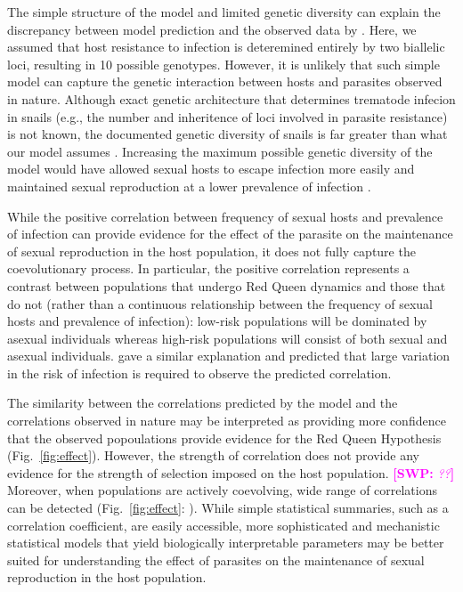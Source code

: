 \documentclass{article}\usepackage[]{graphicx}\usepackage[]{color}
\newcommand{\comment}[3]{\textcolor{#1}{\textbf{[#2: }\textit{#3}\textbf{]}}}
\newcommand{\swp}[1]{\comment{magenta}{SWP}{#1}}
\newcommand{\fref}[1]{Fig.~\ref{fig:#1}}
\begin{document}
The simple structure of the model and limited genetic diversity can explain the discrepancy between model prediction and the observed data by \cite{mckone2016fine}.
Here, we assumed that host resistance to infection is deteremined entirely by two biallelic loci, resulting in 10 possible genotypes.
However, it is unlikely that such simple model can capture the genetic interaction between hosts and parasites observed in nature.
Although exact genetic architecture that determines trematode infecion in snails (e.g., the number and inheritence of loci involved in parasite resistance) is not known, the documented genetic diversity of snails is far greater than what our model assumes \citep{fox1996genetic, king2011parasites, dagan2013clonal}.
Increasing the maximum possible genetic diversity of the model would have allowed sexual hosts to escape infection more easily and maintained sexual reproduction at a lower prevalence of infection \citep{lively2010effect, king2012does, ashby2015diversity}.

While the positive correlation between frequency of sexual hosts and prevalence of infection can provide evidence for the effect of the parasite on the maintenance of sexual reproduction in the host population, it does not fully capture the coevolutionary process.
In particular, the positive correlation represents a contrast between populations that undergo Red Queen dynamics and those that do not (rather than a continuous relationship between the frequency of sexual hosts and prevalence of infection):
low-risk populations will be dominated by asexual individuals whereas high-risk populations will consist of both sexual and asexual individuals.
\cite{lively2001trematode} gave a similar explanation and predicted that large variation in the risk of infection is required to observe the predicted correlation.

The similarity between the correlations predicted by the model and the correlations observed in nature may be interpreted as providing more confidence that the observed popoulations provide evidence for the Red Queen Hypothesis (\fref{effect}).
However, the strength of correlation does not provide any evidence for the strength of selection imposed on the host population. \swp{??}
Moreover, when populations are actively coevolving, wide range of correlations can be detected (\fref{effect}: \cite{vergara2014infection}).
While simple statistical summaries, such as a correlation coefficient, are easily accessible,
more sophisticated and mechanistic statistical models that yield biologically interpretable parameters may be better suited for understanding the effect of parasites on the maintenance of sexual reproduction in the host population.
\end{document}
